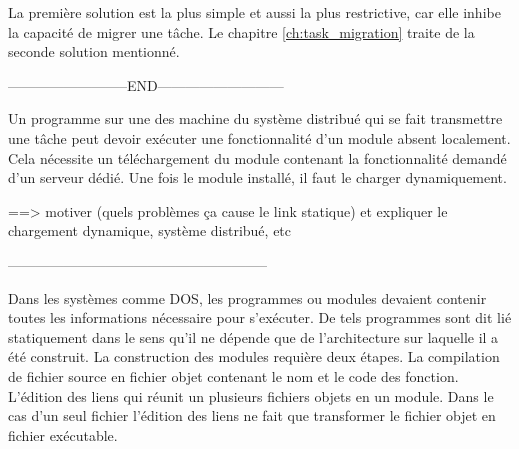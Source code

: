 La première solution est la plus simple et aussi la
plus restrictive, car elle inhibe la capacité de migrer une tâche. Le chapitre
\ref{ch:task_migration} traite de la seconde solution mentionné.





--------------------------END---------------------------

Un programme sur une des machine du système distribué qui se fait transmettre
une tâche peut devoir exécuter une fonctionnalité d'un module absent
localement. Cela nécessite un téléchargement du module contenant la
fonctionnalité demandé d'un serveur dédié. Une fois le module installé, il faut
le charger dynamiquement.

==> motiver (quels problèmes ça cause le link statique) et expliquer le chargement dynamique, système distribué, etc



--------------------------------------------------------


Dans les systèmes comme DOS, les programmes ou modules devaient contenir toutes les
informations nécessaire pour s'exécuter. De tels programmes sont dit lié
statiquement dans le sens qu'il ne dépende que de l'architecture sur laquelle il
a été construit. La construction des modules requière deux étapes. La compilation
de fichier source en fichier objet contenant le nom et le code des fonction.
L'édition des liens qui réunit un plusieurs fichiers objets en un module.
Dans le cas d'un seul fichier l'édition des liens ne fait que transformer le fichier
objet en fichier exécutable.

